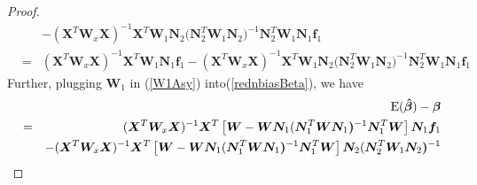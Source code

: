 \documentclass[review]{elsarticle}
\begin{document}
\begin{proof}
\begin{eqnarray}
&& 
-
(\boldsymbol X^T  \boldsymbol W_x \boldsymbol X )^{-1} \boldsymbol X^T
\boldsymbol W_1 \boldsymbol N_2 
(\boldsymbol N_2^T  \boldsymbol W_1 \boldsymbol N_2 \boldsymbol )^{-1} 
\boldsymbol N_2^T  \boldsymbol W_1 
\boldsymbol N_{1} \boldsymbol f_1 \nonumber\\
&=&  \label{rednbiasBeta}
(\boldsymbol X^T  \boldsymbol W_x \boldsymbol X )^{-1} \boldsymbol X^T 
\boldsymbol W_1 \boldsymbol N_{1} \boldsymbol f_1 
-
(\boldsymbol X^T  \boldsymbol W_x \boldsymbol X )^{-1} \boldsymbol X^T 
\boldsymbol W_1 \boldsymbol N_2 
(\boldsymbol N_2^T  \boldsymbol W_1 \boldsymbol N_2 \boldsymbol )^{-1} 
\boldsymbol N_2^T \boldsymbol W_1
\boldsymbol N_{1} \boldsymbol f_1 
\end{eqnarray}
Further, plugging  $\bm W_1$ in (\ref{W1Asy}) into(\ref{rednbiasBeta}), we have 
\begin{eqnarray*}
&& 
{\rm E}(\boldsymbol {\hat \beta})  -  \boldsymbol \beta  \nonumber \\
&=& 
(\boldsymbol X^T  \boldsymbol W_x \boldsymbol X )^{-1} \boldsymbol X^T 
\left[\boldsymbol W 
-
\boldsymbol W \boldsymbol N_1 
(\boldsymbol N_1^T  \boldsymbol W \boldsymbol N_1 \boldsymbol)^{-1} 
\boldsymbol N_1^T  \boldsymbol W \right] \boldsymbol N_{1} \boldsymbol f_1 \\
&&
-
(\boldsymbol X^T  \boldsymbol W_x \boldsymbol X )^{-1} \boldsymbol X^T 
\left[\boldsymbol W 
-
\boldsymbol W \boldsymbol N_1 
(\boldsymbol N_1^T  \boldsymbol W \boldsymbol N_1 \boldsymbol)^{-1} 
\boldsymbol N_1^T  \boldsymbol W \right] \boldsymbol N_2 
(\boldsymbol N_2^T  \boldsymbol W_1 \boldsymbol N_2 \boldsymbol )^{-1} 

\end{eqnarray*}
\end{proof}
\end{document}
